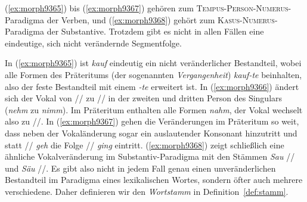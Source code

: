 \begin{exe}
  \ex \label{ex:morph9365}
  \begin{xlist}
  \end{xlist}
  \ex \label{ex:morph9366}
  \begin{xlist}
  \end{xlist}
  \ex \label{ex:morph9367}
  \begin{xlist}
  \end{xlist}
  \ex \label{ex:morph9368}
  \begin{xlist}
  \end{xlist}
\end{exe}


(\ref{ex:morph9365}) bis (\ref{ex:morph9367}) gehören zum \textsc{Tempus}-\textsc{Person}-\textsc{Numerus}-Paradigma der Verben, und (\ref{ex:morph9368}) gehört zum \textsc{Kasus}-\textsc{Numerus}-Paradigma der Substantive.
Trotzdem gibt es nicht in allen Fällen eine eindeutige, sich nicht verändernde Segmentfolge.

In (\ref{ex:morph9365}) ist \textit{kauf} eindeutig ein nicht veränderlicher Bestandteil, wobei alle Formen des Präteritums (der sogenannten \textit{Vergangenheit}) \textit{kauf-te} beinhalten, also der feste Bestandteil mit einem \textit{-te} erweitert ist.
In (\ref{ex:morph9366}) ändert sich der Vokal von // zu // in der zweiten und dritten Person des Singulars (\textit{nehm} zu \textit{nimm}).
Im Präteritum enthalten alle Formen \textit{nahm}, der Vokal wechselt also zu //.
In (\ref{ex:morph9367}) gehen die Veränderungen im Präteritum so weit, dass neben der Vokaländerung sogar ein auslautender Konsonant hinzutritt und statt // \textit{geh} die Folge // \textit{ging} eintritt.
(\ref{ex:morph9368}) zeigt schließlich eine ähnliche Vokalveränderung im Substantiv-Paradigma mit den Stämmen \textit{Sau} // und \textit{Säu} //.
Es gibt also nicht in jedem Fall genau einen unveränderlichen Bestandteil im Paradigma eines lexikalischen Wortes, sondern öfter auch mehrere verschiedene.
Daher definieren wir den \textit{Wortstamm} in Definition~\ref{def:stamm}.


